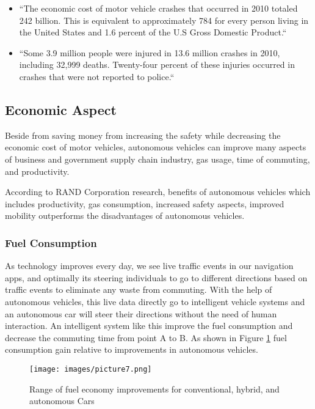 \documentclass[sigconf]{acmart}
\begin{document}
\begin{itemize}

\item ``The economic cost of motor vehicle crashes that occurred in 2010 totaled 242 billion. This is equivalent to approximately 784 for every person living in the United States and 1.6 percent of the U.S Gross Domestic Product\cite{lawrance}.``

\item ``Some 3.9 million people were injured in 13.6 million cr\-as\-hes in 2010, including 32,999 deaths. Twenty-four percent of these injuries occurred in crashes that were not reported to police\cite{lawrance}.``

\end{itemize}


\subsection{Economic Aspect}
Beside from saving money from increasing the safety while decreasing the economic cost of motor vehicles, autonomous vehicles can improve many aspects of business and government supply chain industry, gas usage, time of commuting, and productivity.

\par According to RAND Corporation research, benefits of aut\-ono\-mous vehicles which includes productivity, gas consumption, increased safety aspects, improved mobility outperforms the disadvantages of autonomous vehicles\cite{RAND}.

\subsubsection{Fuel Consumption}As technology improves every day, we see live traffic events in our navigation apps, and optimally its steering individuals to go to different directions based on traffic events to eliminate any waste from commuting\cite{toronto}. With the help of autonomous vehicles, this live data directly go to intelligent vehicle systems and an autonomous car will steer their directions without the need of human interaction. An intelligent system like this improve the fuel consumption and decrease the commuting time from point A to B\cite{toronto}. As shown in Figure \ref{fig:fuelconsumption} fuel consumption gain relative to improvements in autonomous vehicles\cite{toronto}.

\begin{figure}[!ht]
  \centering
      \texttt{[image: images/picture7.png]}
  \caption{Range of fuel economy improvements for conventional, hybrid, and autonomous Cars}\label{fig:fuelconsumption}
\end{figure}
\end{document}
